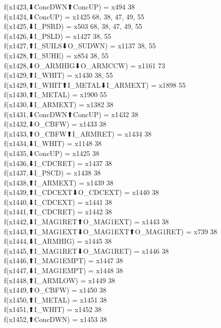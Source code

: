 f(x1423,⬇ConcDWN⬆ConcUP) = x494 {38} \\
f(x1424,⬇ConcUP) = x1425 {68, 38, 47, 49, 55} \\
f(x1425,⬇I_PSRD) = x503 {68, 38, 47, 49, 55} \\
f(x1426,⬇I_PSLD) = x1427 {38, 55} \\
f(x1427,⬆I_SUILS⬇O_SUDWN) = x1137 {38, 55} \\
f(x1428,⬆I_SUHE) = x854 {38, 55} \\
f(x1428,⬇O_ARMHIG⬇O_ARMCCW) = x1161 {73} \\
f(x1429,⬆I_WHIT) = x1430 {38, 55} \\
f(x1429,⬆I_WHIT⬆I_METAL⬇I_ARMEXT) = x1898 {55} \\
f(x1430,⬆I_METAL) = x1900 {55} \\
f(x1430,⬇I_ARMEXT) = x1382 {38} \\
f(x1431,⬇ConcDWN⬆ConcUP) = x1432 {38} \\
f(x1432,⬇O_CBFW) = x1433 {38} \\
f(x1433,⬆O_CBFW⬆I_ARMRET) = x1434 {38} \\
f(x1434,⬇I_WHIT) = x1148 {38} \\
f(x1435,⬇ConcUP) = x1425 {38} \\
f(x1436,⬇I_CDCRET) = x1437 {38} \\
f(x1437,⬇I_PSCD) = x1438 {38} \\
f(x1438,⬆I_ARMEXT) = x1439 {38} \\
f(x1439,⬆I_CDCEXT⬇O_CDCEXT) = x1440 {38} \\
f(x1440,⬇I_CDCEXT) = x1441 {38} \\
f(x1441,⬆I_CDCRET) = x1442 {38} \\
f(x1442,⬇I_MAG1RET⬆O_MAG1EXT) = x1443 {38} \\
f(x1443,⬆I_MAG1EXT⬇O_MAG1EXT⬆O_MAG1RET) = x739 {38} \\
f(x1444,⬇I_ARMHIG) = x1445 {38} \\
f(x1445,⬆I_MAG1RET⬇O_MAG1RET) = x1446 {38} \\
f(x1446,⬆I_MAG1EMPT) = x1447 {38} \\
f(x1447,⬇I_MAG1EMPT) = x1448 {38} \\
f(x1448,⬆I_ARMLOW) = x1449 {38} \\
f(x1449,⬆O_CBFW) = x1450 {38} \\
f(x1450,⬆I_METAL) = x1451 {38} \\
f(x1451,⬆I_WHIT) = x1452 {38} \\
f(x1452,⬆ConcDWN) = x1453 {38} \\
